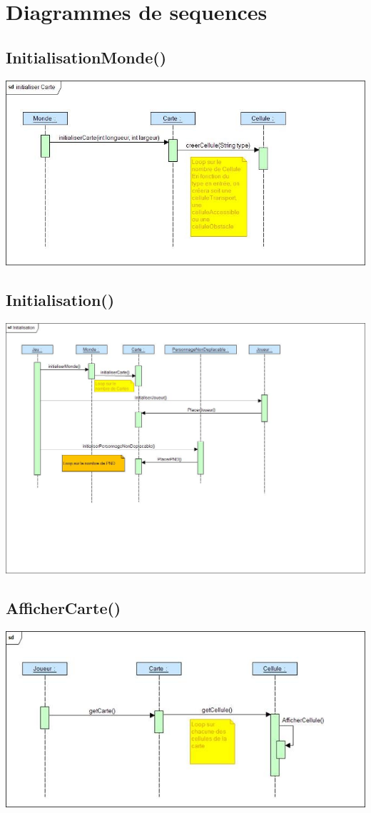 \chapter{Diagrammes de sequences}
    \section{InitialisationMonde()}
        \includegraphics[width=\textwidth,height=\textheight,keepaspectratio]{../graph/DiagrammeSequenceInitialisationCarte.jpg}
    \section{Initialisation()}
        \includegraphics[width=\textwidth,height=\textheight,keepaspectratio]{../graph/DiagrammeSequenceInitialisation.jpg}
    \section{AfficherCarte()}
        \includegraphics[width=\textwidth,height=\textheight,keepaspectratio]{../graph/DiagrammeSequenceAfficherCarte.jpg}
